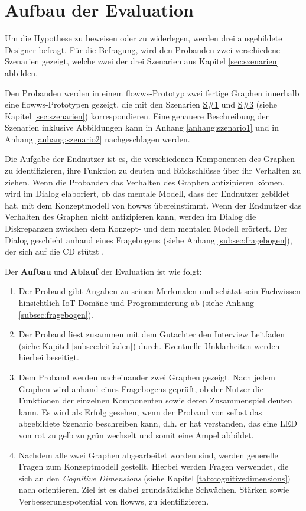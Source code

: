 \section{Aufbau der Evaluation}
Um die Hypothese zu beweisen oder zu widerlegen, werden drei ausgebildete Designer befragt. Für die Befragung, wird den Probanden zwei verschiedene Szenarien gezeigt, welche zwei der drei Szenarien aus Kapitel \ref{sec:szenarien} abbilden.

Den Probanden werden in einem flowws-Prototyp zwei fertige Graphen innerhalb eine flowws-Prototypen gezeigt, die mit den Szenarien \hyperref[szenario1]{S\#1} und  \hyperref[szenario3]{S\#3} (siehe Kapitel \ref{sec:szenarien}) korrespondieren. Eine genauere Beschreibung der Szenarien inklusive Abbildungen kann in Anhang \ref{anhang:szenario1} und in Anhang \ref{anhang:szenario2} nachgeschlagen werden.

Die Aufgabe der Endnutzer ist es, die verschiedenen Komponenten des Graphen zu identifizieren, ihre Funktion zu deuten und Rückschlüsse über ihr Verhalten zu ziehen. Wenn die Probanden das Verhalten des Graphen antizipieren können, wird im Dialog elaboriert, ob das mentale Modell, dass der Endnutzer gebildet hat, mit dem Konzeptmodell von flowws übereinstimmt. Wenn der Endnutzer das Verhalten des Graphen nicht antizipieren kann, werden im Dialog die Diskrepanzen zwischen dem Konzept- und dem mentalen Modell erörtert. Der Dialog geschieht anhand eines Fragebogens (siehe Anhang \ref{subsec:fragebogen}), der sich auf die \ac{CD} stützt \cite{blackwell2000cognitive}.

Der \textbf{Aufbau} und \textbf{Ablauf} der Evaluation ist wie folgt:
\begin{enumerate}
    \item Der Proband gibt Angaben zu seinen Merkmalen und schätzt sein Fachwissen hinsichtlich \ac{IoT}-Domäne und Programmierung ab (siehe Anhang \ref{subsec:fragebogen}).
    \item Der Proband liest zusammen mit dem Gutachter den Interview Leitfaden (siehe Kapitel \ref{subsec:leitfaden}) durch. Eventuelle Unklarheiten werden hierbei beseitigt. 
    \item Dem Proband werden nacheinander zwei Graphen gezeigt. Nach jedem Graphen wird anhand eines Fragebogens geprüft, ob der Nutzer die Funktionen der einzelnen Komponenten sowie deren Zusammenspiel deuten kann. Es wird als Erfolg gesehen, wenn der Proband von selbst das abgebildete Szenario beschreiben kann, d.h. er hat verstanden, das eine LED von rot zu gelb zu grün wechselt und somit eine Ampel abbildet. 
    \item Nachdem alle zwei Graphen abgearbeitet worden sind, werden generelle Fragen zum Konzeptmodell gestellt. Hierbei werden Fragen verwendet, die sich an den \textit{Cognitive Dimensions} (siehe Kapitel \ref{tab:cognitivedimensions}) nach \cite{blackwell2000cognitive} orientieren. Ziel ist es dabei grundsätzliche Schwächen, Stärken sowie Verbesserungspotential von flowws, zu identifizieren.
\end{enumerate}


